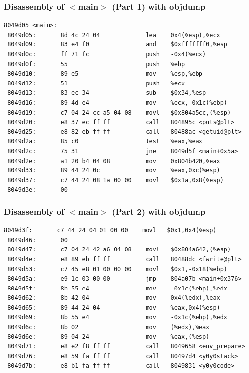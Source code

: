 \begin{frame}[fragile]
\frametitle{Disassembly of $<$main$>$ (Part 1) with objdump}

\begin{lstlisting}[basicstyle=\ttfamily\scriptsize]
8049d05 <main>:
 8049d05:       8d 4c 24 04             lea    0x4(%esp),%ecx
 8049d09:       83 e4 f0                and    $0xfffffff0,%esp
 8049d0c:       ff 71 fc                push   -0x4(%ecx)
 8049d0f:       55                      push   %ebp
 8049d10:       89 e5                   mov    %esp,%ebp
 8049d12:       51                      push   %ecx
 8049d13:       83 ec 34                sub    $0x34,%esp
 8049d16:       89 4d e4                mov    %ecx,-0x1c(%ebp)
 8049d19:       c7 04 24 cc a5 04 08    movl   $0x804a5cc,(%esp)
 8049d20:       e8 37 ec ff ff          call   804895c <puts@plt>
 8049d25:       e8 82 eb ff ff          call   80488ac <getuid@plt>
 8049d2a:       85 c0                   test   %eax,%eax
 8049d2c:       75 31                   jne    8049d5f <main+0x5a>
 8049d2e:       a1 20 b4 04 08          mov    0x804b420,%eax
 8049d33:       89 44 24 0c             mov    %eax,0xc(%esp)
 8049d37:       c7 44 24 08 1a 00 00    movl   $0x1a,0x8(%esp)
 8049d3e:       00
\end{lstlisting}

\end{frame}

\begin{frame}[fragile]
\frametitle{Disassembly of $<$main$>$ (Part 2) with objdump}

\begin{lstlisting}[basicstyle=\ttfamily\scriptsize]
 8049d3f:       c7 44 24 04 01 00 00    movl   $0x1,0x4(%esp)
 8049d46:       00
 8049d47:       c7 04 24 42 a6 04 08    movl   $0x804a642,(%esp)
 8049d4e:       e8 89 eb ff ff          call   80488dc <fwrite@plt>
 8049d53:       c7 45 e8 01 00 00 00    movl   $0x1,-0x18(%ebp)
 8049d5a:       e9 1c 03 00 00          jmp    804a07b <main+0x376>
 8049d5f:       8b 55 e4                mov    -0x1c(%ebp),%edx
 8049d62:       8b 42 04                mov    0x4(%edx),%eax
 8049d65:       89 44 24 04             mov    %eax,0x4(%esp)
 8049d69:       8b 55 e4                mov    -0x1c(%ebp),%edx
 8049d6c:       8b 02                   mov    (%edx),%eax
 8049d6e:       89 04 24                mov    %eax,(%esp)
 8049d71:       e8 e2 f8 ff ff          call   8049658 <env_prepare>
 8049d76:       e8 59 fa ff ff          call   80497d4 <y0y0stack>
 8049d7b:       e8 b1 fa ff ff          call   8049831 <y0y0code>
\end{lstlisting}

\end{frame}



